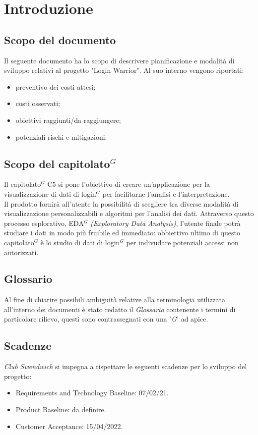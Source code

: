 \section{Introduzione}
\subsection{Scopo del documento}
Il seguente documento ha lo scopo di descrivere pianificazione e modalità di sviluppo relativi al progetto "Login Warrior".
Al suo interno vengono riportati:
\begin{itemize}
    \item preventivo dei costi attesi;
    \item costi osservati;
    \item obiettivi raggiunti/da raggiungere;
    \item potenziali rischi e mitigazioni.
\end{itemize}

\subsection{Scopo del capitolato$^G$ }
Il capitolato$^G$  C5 si pone l'obiettivo di creare un'applicazione per la visualizzazione di dati di login$^G$
per facilitarne l'analisi e l'interpretazione.\\
Il prodotto fornirà all'utente la possibilità di scegliere tra diverse
modalità di visualizzazione personalizzabili e algoritmi per l'analisi dei dati.
Attraverso questo processo esplorativo, EDA$^G$  \textit{(Exploratory Data Analysis)},
l'utente finale potrà studiare i dati in modo più fruibile ed immediato: obbiettivo ultimo
di questo capitolato$^G$  è lo studio di dati di login$^G$  per indivudare potenziali accessi non autorizzati.

\subsection{Glossario}
Al fine di chiarire possibili ambiguità relative alla terminologia utilizzata all'interno dei documenti è stato redatto il \textit{Glossario} contenente i termini di particolare rilievo,
questi sono contrassegnati con una '\textit{G}' ad apice.

\subsection{Scadenze}
\textit{Club Swendwich} si impegna a rispettare le seguenti scadenze per lo sviluppo del progetto:
\begin{itemize}
    \item Requirements and Technology Baseline: 07/02/21.
    \item Product Baseline: da definire.
    \item Customer Acceptance: 15/04/2022.
\end{itemize}